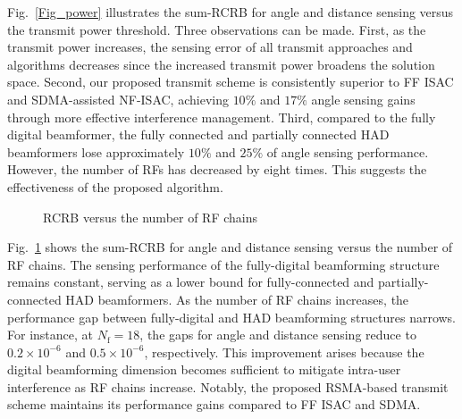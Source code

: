 \documentclass[10pt,journal,twocolumn]{IEEEtran}
\begin{document}
Fig.~\ref{Fig_power} illustrates the sum-RCRB for angle and distance sensing versus the transmit power threshold. Three observations can be made. First, as the transmit power increases, the sensing error of all transmit approaches and algorithms decreases since the increased transmit power broadens the solution space. Second, our proposed transmit scheme is consistently superior to FF ISAC and SDMA-assisted NF-ISAC, achieving $10\%$ and $17\%$ angle sensing gains through more effective interference management. Third, compared to the fully digital beamformer, the fully connected and partially connected HAD beamformers lose approximately $10\%$ and $25\%$ of angle sensing performance. However, the number of RFs has decreased by eight times. This suggests the effectiveness of the proposed algorithm. 

\begin{figure}[tbp]
	\centering
	\centering
	\caption{RCRB versus the number of RF chains}
	\label{Fig_RF}
    \vspace{-0.3cm}
\end{figure}
Fig.~\ref{Fig_RF} shows the sum-RCRB for angle and distance sensing versus the number of RF chains. The sensing performance of the fully-digital beamforming structure remains constant, serving as a lower bound for fully-connected and partially-connected HAD beamformers. As the number of RF chains increases, the performance gap between fully-digital and HAD beamforming structures narrows. For instance, at $N_{\text{f}}=18$, the gaps for angle and distance sensing reduce to $0.2\times 10^{-6}$ and $0.5\times 10^{-6}$, respectively. This improvement arises because the digital beamforming dimension becomes sufficient to mitigate intra-user interference as RF chains increase. Notably, the proposed RSMA-based transmit scheme maintains its performance gains compared to FF ISAC and SDMA.
\end{document}
